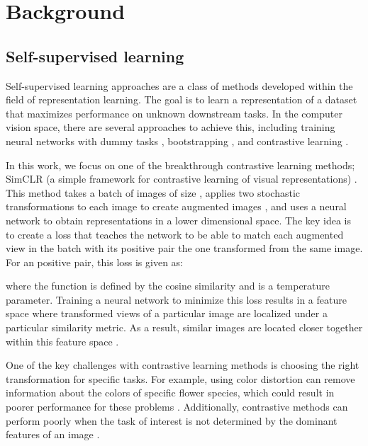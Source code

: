 \documentclass{article}
\begin{document}
\section{Background}

\subsection{Self-supervised learning}

Self-supervised learning approaches are a class of methods developed within the field of representation learning. The goal is to learn a representation of a dataset that maximizes performance on unknown downstream tasks. In the computer vision space, there are several approaches to achieve this, including training neural networks with dummy tasks \citep{komodakis2018unsupervised}, bootstrapping \citep{grill2020bootstrap, caron2021emerging}, and contrastive learning \citep{chen2020simple}.

In this work, we focus on one of the breakthrough contrastive learning methods; SimCLR (a simple framework for contrastive learning of visual representations) \citep{chen2020simple}. This method takes a batch of images  of size , applies two stochastic transformations to each image to create  augmented images , and uses a neural network to obtain representations  in a lower dimensional space. The key idea is to create a loss that teaches the network to be able to match each augmented view in the batch with its positive pair \textemdash{} the one transformed from the same image. For an  positive pair, this loss is given as:



where the function  is defined by the cosine similarity  and  is a temperature parameter. Training a neural network to minimize this loss results in a feature space  where transformed views of a particular image are localized under a particular similarity metric. As a result, similar images are located closer together within this feature space \citep{van2020scan}.

One of the key challenges with contrastive learning methods is choosing the right transformation for specific tasks. For example, using color distortion can remove information about the colors of specific flower species, which could result in poorer performance for these problems \citep{zhang2022rethinking}. Additionally, contrastive methods can perform poorly when the task of interest is not determined by the dominant features of an image \citep{chen2021intriguing}.
\end{document}
